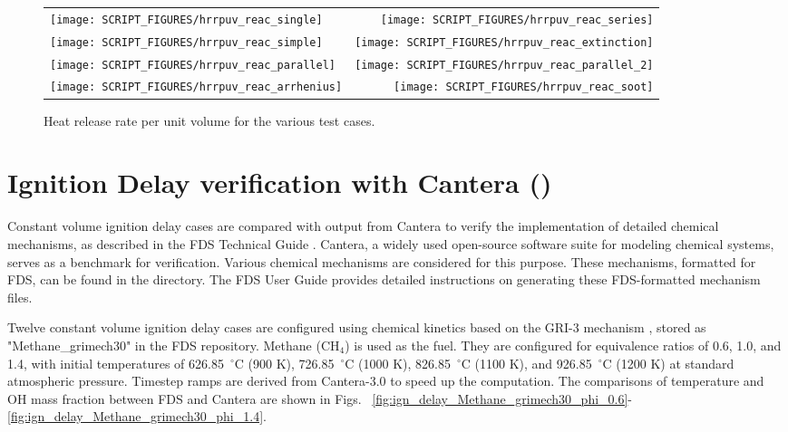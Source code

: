 \documentclass[11pt]{book}
\begin{document}
\begin{figure}[p]
\begin{tabular*}{\textwidth}{lr}
\texttt{[image: SCRIPT\_FIGURES/hrrpuv\_reac\_single]} &
\texttt{[image: SCRIPT\_FIGURES/hrrpuv\_reac\_series]} \\
\texttt{[image: SCRIPT\_FIGURES/hrrpuv\_reac\_simple]} &
\texttt{[image: SCRIPT\_FIGURES/hrrpuv\_reac\_extinction]} \\
\texttt{[image: SCRIPT\_FIGURES/hrrpuv\_reac\_parallel]} &
\texttt{[image: SCRIPT\_FIGURES/hrrpuv\_reac\_parallel\_2]} \\
\texttt{[image: SCRIPT\_FIGURES/hrrpuv\_reac\_arrhenius]} &
\texttt{[image: SCRIPT\_FIGURES/hrrpuv\_reac\_soot]}
\end{tabular*}
\caption[Results of the  test cases]{Heat release rate per unit volume for the various  test cases.}
\label{hrrpuv_reac_figures}
\end{figure}


\section{Ignition Delay verification with Cantera ()}
\label{ignition_delay}

Constant volume ignition delay cases are compared with output from Cantera \cite{cantera:2023} to verify the implementation of detailed chemical mechanisms, as described in the FDS Technical Guide \cite{FDS_Math_Guide}. Cantera, a widely used open-source software suite for modeling chemical systems, serves as a benchmark for verification. Various chemical mechanisms are considered for this purpose. These mechanisms, formatted for FDS, can be found in the  directory. The FDS User Guide \cite{FDS_Users_Guide} provides detailed instructions on generating these FDS-formatted mechanism files.

Twelve constant volume ignition delay cases are configured using chemical kinetics based on the GRI-3 mechanism \cite{gri3:1999}, stored as "Methane\_grimech30" in the FDS repository. Methane ($\mathrm{CH_4}$) is used as the fuel. They are configured for equivalence ratios of 0.6, 1.0, and 1.4, with initial temperatures of 626.85~$^\circ$C (900 K), 726.85~$^\circ$C (1000 K), 826.85~$^\circ$C (1100 K), and 926.85~$^\circ$C (1200 K) at standard atmospheric pressure. Timestep ramps are derived from Cantera-3.0 to speed up the computation. The comparisons of temperature and OH mass fraction between FDS and Cantera are shown in Figs. ~\ref{fig:ign_delay_Methane_grimech30_phi_0.6}-\ref{fig:ign_delay_Methane_grimech30_phi_1.4}.
\end{document}
